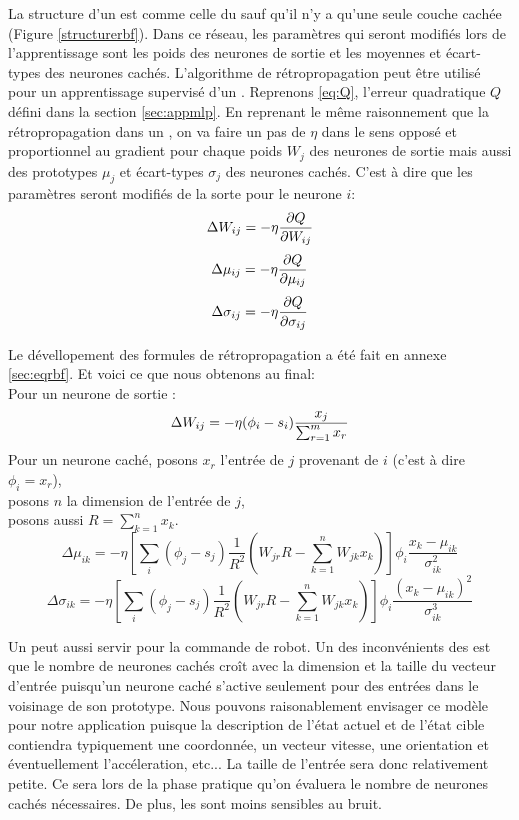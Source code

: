 La structure d'un \rbf est comme celle du \mlp sauf qu'il n'y a qu'une seule couche cachée (Figure \ref{structurerbf}).
Dans ce réseau, les paramètres qui seront modifiés lors de l'apprentissage sont les poids des neurones de sortie et les moyennes et écart-types des neurones cachés.
L'algorithme de rétropropagation peut être utilisé pour un apprentissage supervisé d'un \rbf.
Reprenons \eqref{eq:Q}, l'erreur quadratique $Q$ défini dans la section \ref{sec:appmlp}.
En reprenant le même raisonnement que la rétropropagation dans un \mlp,
on va faire un pas de $\eta$ dans le sens opposé et proportionnel au gradient pour chaque poids $W_{j}$ des neurones de sortie mais aussi des prototypes $\mu_j$ et écart-types $\sigma_j$ des neurones cachés.
C'est à dire que les paramètres seront modifiés de la sorte pour le neurone $i$:
\[\Delta W_{ij} = -\eta \frac{\partial Q}{\partial W_{ij}}\]
\[\Delta \mu_{ij} = -\eta \frac{\partial Q}{\partial \mu_{ij}}\]
\[\Delta \sigma_{ij} = -\eta \frac{\partial Q}{\partial \sigma_{ij}}\]

Le dévellopement des formules de rétropropagation a été fait en annexe \ref{sec:eqrbf}.
Et voici ce que nous obtenons au final:\\
Pour un neurone de sortie :
\[\Delta W_{ij} = -\eta (\phi_i - s_i) \frac{x_j}{\sum_{r=1}^{m}x_{r}}\]
Pour un neurone caché, posons $x_r$ l'entrée de $j$ provenant de $i$ (c'est à dire $\phi_i = x_r$),\\
posons $n$ la dimension de l'entrée de $j$,\\
posons aussi $R = \sum_{k=1}^{n}x_k$.
\[\Delta\mu_{ik} = -\eta \left[\sum_{i}(\phi_j - s_j) \frac{1}{R^2} \left(W_{jr}R - \sum_{k=1}^{n}W_{jk}x_k\right)\right] \phi_i\frac{x_k-\mu_{ik}}{\sigma_{ik}^2}\]
\[\Delta \sigma_{ik} = -\eta \left[\sum_{i}(\phi_j - s_j) \frac{1}{R^2} \left(W_{jr}R - \sum_{k=1}^{n}W_{jk}x_k\right)\right] \phi_i \frac{(x_k-\mu_{ik})^2}{\sigma_{ik}^3}\]

Un \rbf peut aussi servir pour la commande de robot\cite{Gauthier}.
Un des inconvénients des \rbf est que le nombre de neurones cachés croît avec la dimension et la taille du vecteur d'entrée puisqu'un neurone caché s'active seulement pour des entrées dans le voisinage de son prototype.
Nous pouvons raisonablement envisager ce modèle pour notre application puisque la description de l'état actuel et de l'état cible contiendra typiquement une coordonnée, un vecteur vitesse, une orientation et éventuellement l'accéleration, etc...
La taille de l'entrée sera donc relativement petite. Ce sera lors de la phase pratique qu'on évaluera le nombre de neurones cachés nécessaires.
De plus, les \rbf sont moins sensibles au bruit\cite{adversarial}.